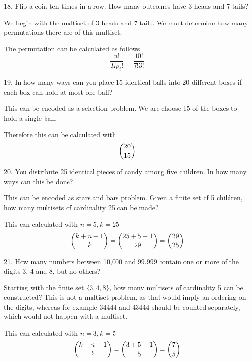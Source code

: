 \documentclass{idrisMemo}
\begin{document}
\begin{prooflist}{18. Flip a coin ten times in a row. How many outcomes have 3 heads and 7 tails?}
\item We begin with the multiset of 3 heads and 7 tails. We must determine how
    many permutations there are of this multiset.
\item The permutation can be calculated as follows
    $$ \dfrac{n!}{\Pi{p_i}!} = \dfrac{10!}{7!3!}$$
\end{prooflist}

\begin{prooflist}{19. In how many ways can you place 15 identical balls into 20
    different boxes if each box can hold at most one ball?}
\item This can be encoded as a selection problem. We are choose 15 of the boxes
    to hold a single ball.
\item Therefore this can be calculated with
    $$ \dbinom{20}{15}$$
\end{prooflist}

\begin{prooflist}{20. You distribute 25 identical pieces of candy among five children. In how many ways can this be done?}
\item This can be encoded as stars and bars problem. Given a finite set of 5
    children, how many multisets of cardinality 25 can be made?
\item This can calculated with $n=5, k=25$
    $$ \dbinom{k+n-1}{k} = \dbinom{25+5-1}{29}=\dbinom{29}{25}$$
\end{prooflist}

\begin{prooflist}{21. How many numbers between 10,000 and 99,999 contain one or more of the digits 3, 4 and 8, but no others?}
\item Starting with the finite set $\{3, 4, 8\}$, how many multisets of
    cardinality 5 can be constructed? This is not a multiset problem, as that
    would imply an ordering on the digits, whereas for example 34444 and 43444
    should be counted separately, which would not happen with a multiset.
\item This can calculated with $n=3, k=5$
    $$ \dbinom{k+n-1}{k} = \dbinom{3+5-1}{5}=\dbinom{7}{5}$$
\end{prooflist}
\end{document}
